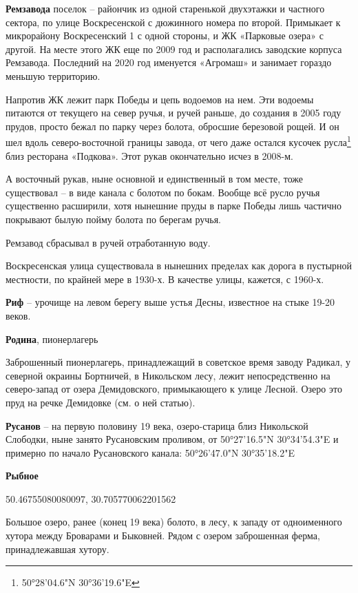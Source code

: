 \newpage

\textbf{Ремзавода} поселок – райончик из одной старенькой двухэтажки и частного сектора, по улице Воскресенской с дюжинного номера по второй. Примыкает к микрорайону Воскресенский 1 с одной стороны, и ЖК «Парковые озера» с другой. На месте этого ЖК еще по 2009 год и располагались заводские корпуса Ремзавода. Последний на 2020 год именуется «Агромаш» и занимает гораздо меньшую территорию.

Напротив ЖК лежит парк Победы и цепь водоемов на нем. Эти водоемы питаются от текущего на север ручья, и ручей раньше, до создания в 2005 году прудов, просто бежал по парку через болота, обросшие березовой рощей. И он шел вдоль северо-восточной границы завода, от чего даже остался кусочек русла\footnote{50°28'04.6"N 30°36'19.6"E} близ ресторана «Подкова». Этот рукав окончательно исчез в 2008-м. 

А восточный рукав, ныне основной и единственный в том месте, тоже существовал – в виде канала с болотом по бокам. Вообще всё русло ручья существенно расширили, хотя нынешние пруды в парке Победы лишь частично покрывают былую пойму болота по берегам ручья.

Ремзавод сбрасывал в ручей отработанную воду.

Воскресенская улица существовала в нынешних пределах как дорога в пустырной местности, по крайней мере в 1930-х. В качестве улицы, кажется,  с 1960-х.\\

\medskip

\textbf{Риф} – урочище на левом берегу выше устья Десны, известное на стыке 19-20 веков.\\

\medskip

\textbf{Родина}, пионерлагерь

Заброшенный пионерлагерь, принадлежащий в советское время заводу Радикал, у северной окраины Бортничей, в Никольском лесу, лежит непосредственно на северо-запад от озера Демидовского, примыкающего к улице Лесной. Озеро это пруд на речке Демидовке (см. о ней статью).\\

\medskip


\textbf{Русанов} – на первую половину 19 века, озеро-старица близ Никольской Слободки, ныне занято Русановским проливом, от 50°27'16.5"N 30°34'54.3"E и примерно по начало Русановского канала: 50°26'47.0"N 30°35'18.2"E\\

\medskip

\textbf{Рыбное} 

50.46755080080097, 30.705770062201562

Большое озеро, ранее (конец 19 века) болото, в лесу, к западу от одноименного хутора между Броварами и Быковней. Рядом с озером заброшенная ферма, принадлежавшая хутору.

